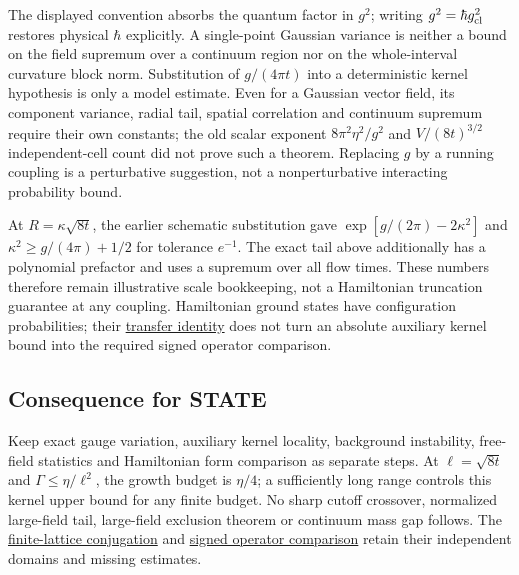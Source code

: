 \documentclass[11pt,a4paper]{article}
\begin{document}
The displayed convention absorbs the quantum factor in \(g^2\); writing
\(g^2=\hbar g_{\rm cl}^2\) restores physical \(\hbar\) explicitly. A
single-point Gaussian variance is neither a bound on the field supremum
over a continuum region nor on the whole-interval curvature block norm.
Substitution of \(g/(4\pi t)\) into a deterministic kernel hypothesis is
only a model estimate. Even for a Gaussian vector field, its component
variance, radial tail, spatial correlation and continuum supremum
require their own constants; the old scalar exponent
\(8\pi^2\eta^2/g^2\) and \(V/(8t)^{3/2}\) independent-cell count did not
prove such a theorem. Replacing \(g\) by a running coupling is a
perturbative suggestion, not a nonperturbative interacting probability
bound.

At \(R=\kappa\sqrt{8t}\), the earlier schematic substitution gave
\(\exp[g/(2\pi)-2\kappa^2]\) and \(\kappa^2\ge g/(4\pi)+1/2\) for
tolerance \(e^{-1}\). The exact tail above additionally has a polynomial
prefactor and uses a supremum over all flow times. These numbers
therefore remain illustrative scale bookkeeping, not a Hamiltonian
truncation guarantee at any coupling. Hamiltonian ground states have
configuration probabilities; their
\href{ground-state-measure-transfer.md}{transfer identity} does not turn
an absolute auxiliary kernel bound into the required signed operator
comparison.

\hypertarget{consequence-for-state}{%
\subsection{Consequence for STATE}\label{consequence-for-state}}

Keep exact gauge variation, auxiliary kernel locality, background
instability, free-field statistics and Hamiltonian form comparison as
separate steps. At \(\ell=\sqrt{8t}\) and \(\Gamma\le\eta/\ell^2\), the
growth budget is \(\eta/4\); a sufficiently long range controls this
kernel upper bound for any finite budget. No sharp cutoff crossover,
normalized large-field tail, large-field exclusion theorem or continuum
mass gap follows. The
\href{flow-conjugation-truncation.md}{finite-lattice conjugation} and
\href{large-field-operator-inequality.md}{signed operator comparison}
retain their independent domains and missing estimates.
\end{document}
